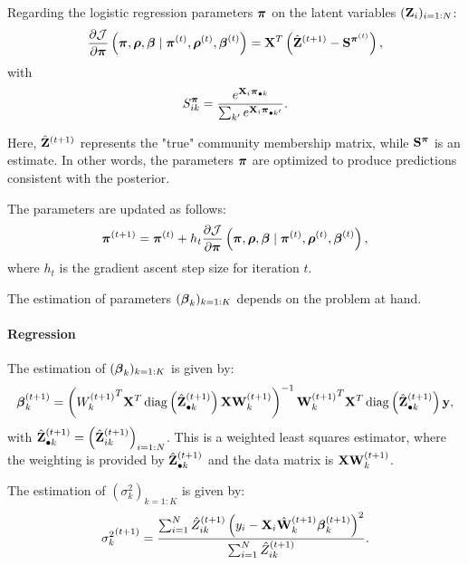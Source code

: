 Regarding the logistic regression parameters $\boldsymbol{\pi}$ on the latent variables $(\mathbf{Z}_i)_{i=1:N}$:
\begin{equation}
    \frac{\partial \mathcal{J}}{\partial \boldsymbol{\pi}}\left(\boldsymbol{\pi}, \boldsymbol{\rho}, \boldsymbol{\beta} \mid \boldsymbol{\pi}^{(t)}, \boldsymbol{\rho}^{(t)}, \boldsymbol{\beta}^{(t)} \right) = \mathbf{X}^T \left( \hat{\mathbf{Z}}^{(t+1)} - \mathbf{S}^{\boldsymbol{\pi}^{(t)}} \right),
    \label{eq: MoEBIUS_pi}
\end{equation}
with
\begin{equation}
    S^{\boldsymbol{\pi}}_{ik} = \dfrac{e^{\mathbf{X}_i \boldsymbol{\pi}_{\bullet k}}}{\sum_{k'} e^{\mathbf{X}_i \boldsymbol{\pi}_{\bullet k'}}}.
\end{equation}

Here, $\hat{\mathbf{Z}}^{(t+1)}$ represents the "true" community membership matrix, while $\mathbf{S}^{\boldsymbol{\pi}}$ is an estimate. In other words, the parameters $\boldsymbol{\pi}$ are optimized to produce predictions consistent with the posterior.

The parameters are updated as follows:
\begin{equation}
    \boldsymbol{\pi}^{(t+1)} =  \boldsymbol{\pi}^{(t)} + h_t  \frac{\partial \mathcal{J}}{\partial \boldsymbol{\pi}}\left(\boldsymbol{\pi}, \boldsymbol{\rho}, \boldsymbol{\beta} \mid \boldsymbol{\pi}^{(t)}, \boldsymbol{\rho}^{(t)}, \boldsymbol{\beta}^{(t)} \right),
\end{equation}
where $h_t$ is the gradient ascent step size for iteration $t$.

The estimation of parameters $(\boldsymbol{\beta}_k)_{k=1:K}$ depends on the problem at hand.

\paragraph{Regression}
The estimation of $(\boldsymbol{\beta}_k)_{k=1:K}$ is given by:
\begin{equation}
    \boldsymbol{\beta}^{(t+1)}_{k} =  \left( {W_{k }^{(t+1)}}^T \mathbf{X}^T \operatorname{diag}\left(\hat{\mathbf{Z}}^{(t+1)}_{\bullet k}\right) \mathbf{X} \mathbf{W}^{(t+1)}_{k } \right)^{-1}  {\mathbf{W}^{(t+1)}_{k }}^T \mathbf{X}^T \operatorname{diag}\left(\hat{\mathbf{Z}}^{(t+1)}_{\bullet k}\right) \mathbf{y},
    \label{eq: MoEBIUS_beta_reg}
\end{equation}
with $\hat{\mathbf{Z}}^{(t+1)}_{\bullet k} = \left( \hat{\mathbf{Z}}^{(t+1)}_{ik} \right)_{i=1:N}$.
This is a weighted least squares estimator, where the weighting is provided by $\hat{\mathbf{Z}}^{(t+1)}_{\bullet k}$ and the data matrix is $\mathbf{X} \mathbf{W}^{(t+1)}_{k }$.

The estimation of $(\sigma_k^2)_{k=1:K}$ is given by:
\begin{equation}
    {\sigma_k^2}^{(t+1)} = \dfrac{\sum_{i=1}^N \hat{Z}^{(t+1)}_{ik}\left(y_i - \mathbf{X}_i \hat{\mathbf{W}}_{k }^{(t+1)}  \boldsymbol{\beta}_k^{(t+1)} \right)^2}{\sum_{i=1}^N \hat{Z}^{(t+1)}_{ik}}.
    \label{eq: MoEBIUS_sigma_reg}
\end{equation}

